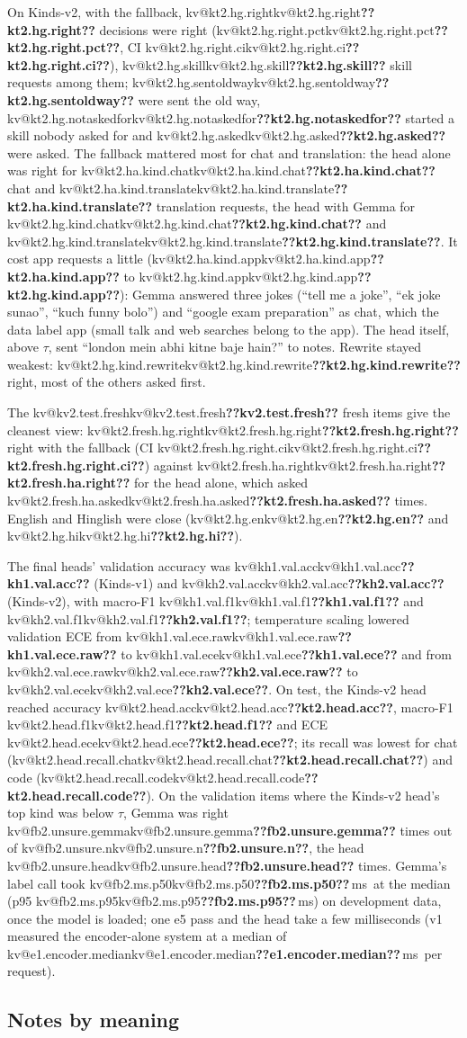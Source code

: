 \documentclass[11pt,a4paper]{article}
\makeatletter
\DeclareRobustCommand{\kv}[1]{\ifcsname kv@#1\endcsname\csname kv@#1\endcsname\else\textbf{??#1??}\fi}
\newcommand{\ms}{\,ms}
\makeatother
\begin{document}
On Kinds-v2, with the fallback, \kv{kt2.hg.right} decisions were right (\kv{kt2.hg.right.pct}, CI
\kv{kt2.hg.right.ci}), \kv{kt2.hg.skill} skill requests among them; \kv{kt2.hg.sentoldway} were sent the old way,
\kv{kt2.hg.notaskedfor} started a skill nobody asked for and \kv{kt2.hg.asked} were asked. The fallback mattered most
for chat and translation: the head alone was right for \kv{kt2.ha.kind.chat} chat and \kv{kt2.ha.kind.translate}
translation requests, the head with Gemma for \kv{kt2.hg.kind.chat} and \kv{kt2.hg.kind.translate}. It cost app
requests a little (\kv{kt2.ha.kind.app} to \kv{kt2.hg.kind.app}): Gemma answered three jokes (``tell me a joke'', ``ek
joke sunao'', ``kuch funny bolo'') and ``google exam preparation'' as chat, which the data label app (small talk and web
searches belong to the app). The head itself, above $\tau$, sent ``london mein abhi kitne baje hain?'' to notes. Rewrite stayed weakest:
\kv{kt2.hg.kind.rewrite} right, most of the others asked first.

The \kv{kv2.test.fresh} fresh items give the cleanest view: \kv{kt2.fresh.hg.right} right with the fallback (CI
\kv{kt2.fresh.hg.right.ci}) against \kv{kt2.fresh.ha.right} for the head alone, which asked
\kv{kt2.fresh.ha.asked} times. English and Hinglish were close (\kv{kt2.hg.en} and \kv{kt2.hg.hi}).

The final heads' validation accuracy was \kv{kh1.val.acc} (Kinds-v1) and \kv{kh2.val.acc} (Kinds-v2), with
macro-F1 \kv{kh1.val.f1} and \kv{kh2.val.f1}; temperature scaling lowered validation ECE from \kv{kh1.val.ece.raw} to
\kv{kh1.val.ece} and from \kv{kh2.val.ece.raw} to \kv{kh2.val.ece}. On test, the Kinds-v2 head reached accuracy
\kv{kt2.head.acc}, macro-F1 \kv{kt2.head.f1} and ECE \kv{kt2.head.ece}; its recall was lowest for chat
(\kv{kt2.head.recall.chat}) and code (\kv{kt2.head.recall.code}). On the validation items where the Kinds-v2 head's top kind
was below $\tau$, Gemma was right \kv{fb2.unsure.gemma} times out of \kv{fb2.unsure.n}, the head \kv{fb2.unsure.head} times.
Gemma's label call took \kv{fb2.ms.p50}\ms\ at the median (p95 \kv{fb2.ms.p95}\ms) on development data, once the
model is loaded; one e5 pass and the head take a few milliseconds (v1 measured the encoder-alone system at a median of
\kv{e1.encoder.median}\ms\ per request).

\subsection{Notes by meaning}\label{sec:res-notes}
\end{document}
